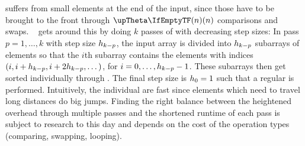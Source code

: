 \section{\texorpdfstring{\ShS{}}{ShellSort}}
\label{sec:tasklet:shell}

\IS{} suffers from small elements at the end of the input, since those have to be brought to the front through \(\bigtheta{n}\) comparisons and swaps.
\ShS{}~\cite{Shell1959AHS} gets around this by doing \(k\) passes of \IS{} with decreasing step sizes:
In pass~\(p = 1, \dots, k\) with step size \(h_{k - p}\), the input array is divided into \(h_{k - p}\) subarrays of elements so that the \(i\)th subarray contains the elements with indices \((i, i + h_{k - p}, i + 2 h_{k - p}, \dots)\), for \(i = 0, \dots, h_{k - p} - 1\).
These subarrays then get sorted individually through \IS{}.
The final step size is \(h_0 = 1\) such that a regular \IS{} is performed.
Intuitively, the individual \IS*{} are fast since elements which need to travel long distances do big jumps.
Finding the right balance between the heightened overhead through multiple \IS{} passes and the shortened runtime of each \IS{} pass is subject to research to this day \cite{skean2023optimization,lee2021empirically} and depends on the cost of the operation types (comparing, swapping, looping).


